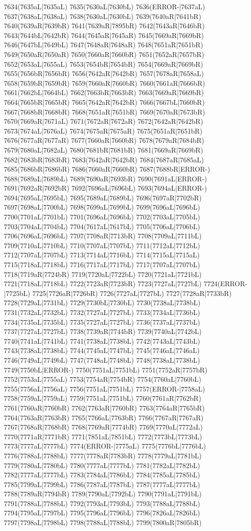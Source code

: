 7634(7635aL|7635aL) 7635(7630aL|7630bL) 7636(ERROR-|7637aL) 7637(7638aL|7638aL) 7638(7630aL|7630bL) 7639(7640aR|7641bR) 7640(7639aR|7639bR) 7641(7639aR|7895bR) 7642(7643aR|7646bR) 7643(7644bL|7642bR) 7644(7645aR|7645aR) 7645(7669aR|7669bR) 7646(7647bL|7649bL) 7647(7648aR|7648aR) 7648(7651aR|7651bR) 7649(7650aR|7650aR) 7650(7660aR|7660bR) 7651(7652aR|7657bR) 7652(7653aL|7655aL) 7653(7654bR|7654bR) 7654(7669aR|7669bR) 7655(7656bR|7656bR) 7656(7642aR|7642bR) 7657(7678aR|7658aL) 7658(7659bR|7659bR) 7659(7660aR|7660bR) 7660(7661aR|7666bR) 7661(7662bL|7664bL) 7662(7663bR|7663bR) 7663(7669aR|7669bR) 7664(7665bR|7665bR) 7665(7642aR|7642bR) 7666(7667bL|7660bR) 7667(7668bR|7668bR) 7668(7651aR|7651bR) 7669(7670aR|7673bR) 7670(7669aR|7671aL) 7671(7672aR|7672aR) 7672(7642aR|7642bR) 7673(7674aL|7676aL) 7674(7675aR|7675aR) 7675(7651aR|7651bR) 7676(7677aR|7677aR) 7677(7660aR|7660bR) 7678(7679aR|7684bR) 7679(7680aL|7682aL) 7680(7681bR|7681bR) 7681(7669aR|7669bR) 7682(7683bR|7683bR) 7683(7642aR|7642bR) 7684(7687aR|7685aL) 7685(7686bR|7686bR) 7686(7660aR|7660bR) 7687(7688bR|ERROR-) 7688(7689aL|7689bL) 7689(7690aR|7693bR) 7690(7691aL|ERROR-) 7691(7692aR|7692bR) 7692(7696aL|7696bL) 7693(7694aL|ERROR-) 7694(7695aL|7695bL) 7695(7689aL|7689bL) 7696(7697aR|7702bR) 7697(7698aL|7700bL) 7698(7699aL|7699bL) 7699(7696aL|7696bL) 7700(7701aL|7701bL) 7701(7696aL|7696bL) 7702(7703aL|7705bL) 7703(7704aL|7704bL) 7704(7617aL|7617bL) 7705(7706aL|7706bL) 7706(7696aL|7696bL) 7707(7708aR|7713bR) 7708(7709aL|7711bL) 7709(7710aL|7710bL) 7710(7707aL|7707bL) 7711(7712aL|7712bL) 7712(7707aL|7707bL) 7713(7714aL|7716bL) 7714(7715aL|7715aL) 7715(7718aL|7718bL) 7716(7717aL|7717bL) 7717(7707aL|7707bL) 7718(7719aR|7724bR) 7719(7720aL|7722bL) 7720(7721aL|7721bL) 7721(7718aL|7718bL) 7722(7723aR|7723bR) 7723(7727aL|7727bL) 7724(ERROR-|7725bL) 7725(7726aR|7726bR) 7726(7727aL|7727bL) 7727(7728aR|7733bR) 7728(7729aL|7731bL) 7729(7730bL|7730bL) 7730(7738aL|7738bL) 7731(7732aL|7732bL) 7732(7727aL|7727bL) 7733(7734aL|7736bL) 7734(7735aL|7735bL) 7735(7727aL|7727bL) 7736(7737aL|7737bL) 7737(7727aL|7727bL) 7738(7739aR|7744bR) 7739(7740aL|7742bL) 7740(7741aL|7741bL) 7741(7738aL|7738bL) 7742(7743aL|7743bL) 7743(7738aL|7738bL) 7744(7745aL|7747bL) 7745(7746aL|7746aL) 7746(7749aL|7749bL) 7747(7748aL|7748bL) 7748(7738aL|7738bL) 7749(7750bL|ERROR-) 7750(7751aL|7751bL) 7751(7752aR|7757bR) 7752(7753aL|7755aL) 7753(7754aR|7754bR) 7754(7760aL|7760bL) 7755(7756aL|7756aL) 7756(7751aL|7751bL) 7757(ERROR-|7758aL) 7758(7759aL|7759aL) 7759(7751aL|7751bL) 7760(7761aR|7762bR) 7761(7760aR|7760bR) 7762(7763aR|7760bR) 7763(7764aR|7765bR) 7764(7763aR|7763bR) 7765(7766aL|7763bR) 7766(7767aR|7767aR) 7767(7768aR|7768bR) 7768(7769aR|7774bR) 7769(7770aL|7772aL) 7770(7771aR|7771bR) 7771(7851aL|7851bL) 7772(7773bL|7773bL) 7773(7777aL|7777bL) 7774(ERROR-|7775aL) 7775(7776bL|7776bL) 7776(7788aL|7788bL) 7777(7778aR|7783bR) 7778(7779aL|7781bL) 7779(7780aL|7780bL) 7780(7777aL|7777bL) 7781(7782aL|7782bL) 7782(7777aL|7777bL) 7783(7784aL|7786bL) 7784(7785aL|7785bL) 7785(7799aL|7799bL) 7786(7787aL|7787bL) 7787(7777aL|7777bL) 7788(7789aR|7794bR) 7789(7790aL|7792bL) 7790(7791aL|7791bL) 7791(7788aL|7788bL) 7792(7793aL|7793bL) 7793(7788aL|7788bL) 7794(7795aL|7797bL) 7795(7796aL|7796bL) 7796(7826aL|7826bL) 7797(7798aL|7798bL) 7798(7788aL|7788bL) 7799(7800aR|7805bR) 